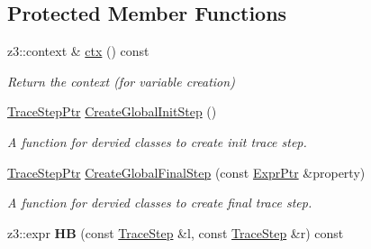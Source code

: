 \subsection*{Protected Member Functions}
\begin{DoxyCompactItemize}
\item 
\mbox{\label{classilang_1_1_memory_model_af2ca71c0d173e7cb5502d05a2e4cf24c}} 
z3\+::context \& \mbox{\hyperlink{classilang_1_1_memory_model_af2ca71c0d173e7cb5502d05a2e4cf24c}{ctx}} () const
\begin{DoxyCompactList}\small\item\em Return the context (for variable creation) \end{DoxyCompactList}\item 
\mbox{\label{classilang_1_1_memory_model_a458a23cdef470ee4778dc8f0c31fc254}} 
\mbox{\hyperlink{classilang_1_1_memory_model_a0a752e8aa7fc6e84b6b6d4e596782860}{Trace\+Step\+Ptr}} \mbox{\hyperlink{classilang_1_1_memory_model_a458a23cdef470ee4778dc8f0c31fc254}{Create\+Global\+Init\+Step}} ()
\begin{DoxyCompactList}\small\item\em A function for dervied classes to create init trace step. \end{DoxyCompactList}\item 
\mbox{\label{classilang_1_1_memory_model_a20682b8c8517c5efc28cb0396aa288f6}} 
\mbox{\hyperlink{classilang_1_1_memory_model_a0a752e8aa7fc6e84b6b6d4e596782860}{Trace\+Step\+Ptr}} \mbox{\hyperlink{classilang_1_1_memory_model_a20682b8c8517c5efc28cb0396aa288f6}{Create\+Global\+Final\+Step}} (const \mbox{\hyperlink{namespaceilang_a7c4196c72e53ea4df4b7861af7bc3bce}{Expr\+Ptr}} \&property)
\begin{DoxyCompactList}\small\item\em A function for dervied classes to create final trace step. \end{DoxyCompactList}\item 
\mbox{\label{classilang_1_1_memory_model_a1cebf4d2cbac6193e3847316dfc422bf}} 
z3\+::expr {\bfseries HB} (const \mbox{\hyperlink{classilang_1_1_trace_step}{Trace\+Step}} \&l, const \mbox{\hyperlink{classilang_1_1_trace_step}{Trace\+Step}} \&r) const
\item 

\end{DoxyCompactItemize}

